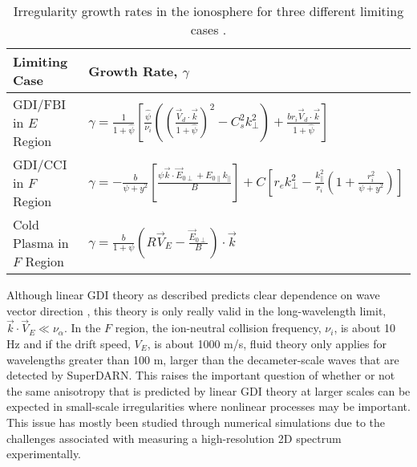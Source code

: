 
\begin{table}
\begin{tabular}{l l}
Limiting Case & Growth Rate, \(\gamma\) \\
\hline
GDI/FBI in \(E\) Region & \(\gamma = \frac{1}{1+\hat{\psi}}\left[\frac{\hat{\psi}}{\nu_i}\left(\left(\frac{\vec{V}_d\cdot \vec{k}}{1+\hat{\psi}}\right)^2-C_s^2 k_\perp^2\right)+\frac{br_i\vec{V}_d\cdot \vec{k}}{1+\hat{\psi}}\right]\) \\
GDI/CCI in \(F\) Region & \(\gamma = -\frac{b}{\psi+y^2}\left[\frac{\psi\vec{k}\cdot\vec{E}_{0\perp}+E_{0\parallel}k_\parallel}{B}\right]+C\left[r_ek_\perp^2-\frac{k_\parallel^2}{r_i}\left(1+\frac{r_i^2}{\psi+y^2}\right)\right]\) \\
Cold Plasma in \(F\) Region & \(\gamma = \frac{b}{1+\psi}\left(R\vec{V}_E-\frac{\vec{E}_{0\perp}}{B}\right)\cdot\vec{k}\) \\
\end{tabular}
\caption[Irregularity growth rates]{Irregularity growth rates in the ionosphere for three different limiting cases \citep{Makarevich2016a}.}
\label{tab:gdi_exps}
\end{table}

Although linear GDI theory as described predicts clear dependence on wave vector direction \citep{Makarevich2014c}, this theory is only really valid in the long-wavelength limit, \(\vec{k}\cdot\vec{V}_E \ll \nu_\alpha\).  In the \(F\) region, the ion-neutral collision frequency, \(\nu_i\), is about 10 Hz and if the drift speed, \(V_E\), is about 1000 m/s, fluid theory only applies for wavelengths greater than 100 m, larger than the decameter-scale waves that are detected by SuperDARN.  This raises the important question of whether or not the same anisotropy that is predicted by linear GDI theory at larger scales can be expected in small-scale irregularities where nonlinear processes may be important.  This issue has mostly been studied through numerical simulations due to the challenges associated with measuring a high-resolution 2D spectrum experimentally.

